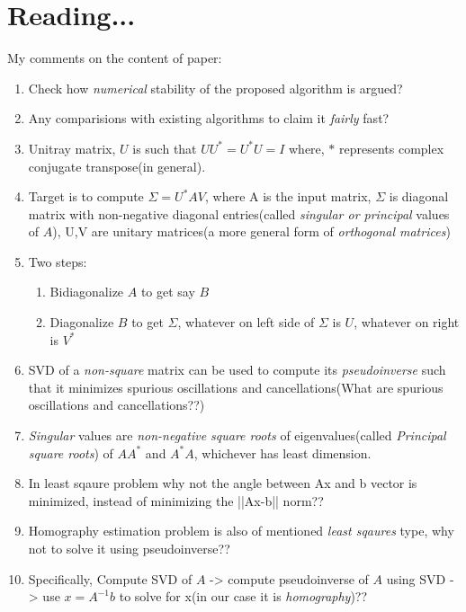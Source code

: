 \documentclass{article}
\begin{document}
\section{Reading...}
My comments on the content of paper:
\begin{enumerate}
\item Check how \textit{numerical} stability of the proposed algorithm is argued?
\item Any comparisions with existing algorithms to claim it \textit{fairly} fast?
\item Unitray matrix, $U$ is such that $UU^{*}=U^{*}U=I$ where, $*$ represents complex conjugate transpose(in general).
\item Target is to compute $\Sigma=U^{*}AV$, where A is the input matrix, $\Sigma$ is diagonal matrix with non-negative diagonal entries(called \textit{singular or principal} values of $A$), U,V are unitary matrices(a more general form of \textit{orthogonal matrices})

\item Two steps:
 \begin{enumerate}
   \item Bidiagonalize $A$ to get say $B$
   \item Diagonalize $B$ to get $\Sigma$, whatever on left side of $\Sigma$ is $U$, whatever on right is $V^{*}$
\end{enumerate}



\item SVD of a \textit{non-square} matrix can be used to compute its \textit{pseudoinverse} such that it minimizes spurious oscillations and cancellations(What are spurious oscillations and cancellations??)

\item \textit{Singular} values are \textit{non-negative square roots} of eigenvalues(called \textit{Principal square roots}) of $AA^{*}$ and $A^{*}A$, whichever has least dimension.

\item In least sqaure problem why not the angle between Ax and b vector is minimized, instead of minimizing the ||Ax-b|| norm??

\item Homography estimation problem is also of mentioned \textit{least sqaures} type, why not to solve it using pseudoinverse??

\item Specifically, Compute SVD of $A$ -> compute pseudoinverse of $A$ using SVD -> use $x=A^{-1}b$ to solve for x(in our case it is \textit{homography})??


\end{enumerate}
\end{document}
